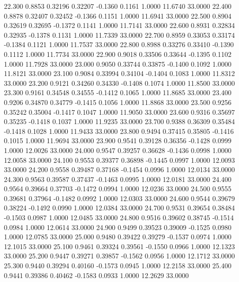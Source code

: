   22.300   0.8853   0.32196   0.32207  -0.1360   0.1161   1.0000  11.6740  33.0000
  22.400   0.8878   0.32407   0.32452  -0.1366   0.1151   1.0000  11.6941  33.0000
  22.500   0.8904   0.32619   0.32695  -0.1372   0.1141   1.0000  11.7141  33.0000
  22.600   0.8931   0.32834   0.32935  -0.1378   0.1131   1.0000  11.7339  33.0000
  22.700   0.8959   0.33053   0.33174  -0.1384   0.1121   1.0000  11.7537  33.0000
  22.800   0.8988   0.33276   0.33410  -0.1390   0.1112   1.0000  11.7734  33.0000
  22.900   0.9018   0.33506   0.33644  -0.1395   0.1102   1.0000  11.7928  33.0000
  23.000   0.9050   0.33744   0.33875  -0.1400   0.1092   1.0000  11.8121  33.0000
  23.100   0.9084   0.33994   0.34104  -0.1404   0.1083   1.0000  11.8312  33.0000
  23.200   0.9121   0.34260   0.34330  -0.1408   0.1074   1.0000  11.8500  33.0000
  23.300   0.9161   0.34548   0.34555  -0.1412   0.1065   1.0000  11.8685  33.0000
  23.400   0.9206   0.34870   0.34779  -0.1415   0.1056   1.0000  11.8868  33.0000
  23.500   0.9256   0.35242   0.35004  -0.1417   0.1047   1.0000  11.9050  33.0000
  23.600   0.9316   0.35697   0.35235  -0.1418   0.1037   1.0000  11.9235  33.0000
  23.700   0.9388   0.36309   0.35484  -0.1418   0.1028   1.0000  11.9433  33.0000
  23.800   0.9494   0.37415   0.35805  -0.1416   0.1015   1.0000  11.9694  33.0000
  23.900   0.9541   0.39128   0.36356  -0.1428   0.0999   1.0000  12.0026  33.0000
  24.000   0.9547   0.39257   0.36628  -0.1436   0.0998   1.0000  12.0058  33.0000
  24.100   0.9553   0.39377   0.36898  -0.1445   0.0997   1.0000  12.0093  33.0000
  24.200   0.9558   0.39487   0.37168  -0.1454   0.0996   1.0000  12.0134  33.0000
  24.300   0.9563   0.39587   0.37437  -0.1463   0.0995   1.0000  12.0181  33.0000
  24.400   0.9564   0.39664   0.37703  -0.1472   0.0994   1.0000  12.0236  33.0000
  24.500   0.9555   0.39681   0.37964  -0.1482   0.0992   1.0000  12.0303  33.0000
  24.600   0.9544   0.39679   0.38224  -0.1492   0.0990   1.0000  12.0384  33.0000
  24.700   0.9531   0.39654   0.38484  -0.1503   0.0987   1.0000  12.0485  33.0000
  24.800   0.9516   0.39602   0.38745  -0.1514   0.0984   1.0000  12.0614  33.0000
  24.900   0.9499   0.39523   0.39009  -0.1525   0.0980   1.0000  12.0785  33.0000
  25.000   0.9480   0.39422   0.39279  -0.1537   0.0974   1.0000  12.1015  33.0000
  25.100   0.9461   0.39324   0.39561  -0.1550   0.0966   1.0000  12.1323  33.0000
  25.200   0.9447   0.39271   0.39857  -0.1562   0.0956   1.0000  12.1712  33.0000
  25.300   0.9440   0.39294   0.40160  -0.1573   0.0945   1.0000  12.2158  33.0000
  25.400   0.9441   0.39386   0.40462  -0.1583   0.0933   1.0000  12.2629  33.0000
